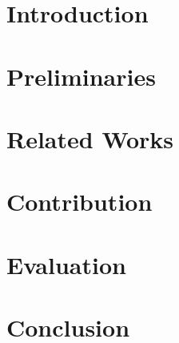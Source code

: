 \documentclass{llncs2e/llncs}
\begin{document}
\def\todo#1{{\color{red}TODO:\quad#1}}
\def\addref#1{{\color{red}$[$#1$]$}}
\def\undef{\textit{undef}}

\section{Introduction}


\section{Preliminaries}


\section{Related Works}


\section{Contribution}


\section{Evaluation}


\section{Conclusion}


%
%
\newpage
\nocite{*}


\end{document}
